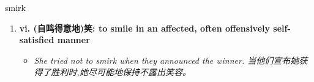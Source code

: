 
\begin{frame}
{\huge smirk}
\begin{center}
\begin{enumerate}\Large
  \item \textbf{vi. (自鸣得意地)笑: to smile in an affected, often offensively self-satisfied manner}
  \begin{itemize}
    \item \em{\Large{She tried not to smirk when they announced the winner. 当他们宣布她获得了胜利时,她尽可能地保持不露出笑容。}}
  \end{itemize}
\end{enumerate}
\end{center}
\end{frame}
